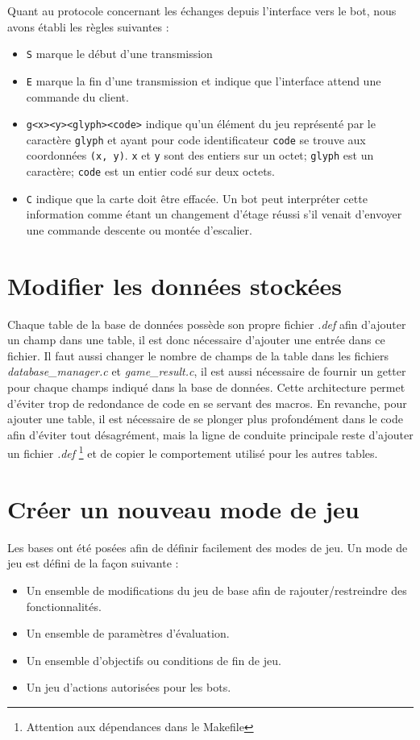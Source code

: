 \documentclass[10pt,a4paper]{report}
\begin{document}
Quant au protocole concernant les échanges depuis l'interface vers le bot, nous avons établi les règles suivantes :
\begin{itemize}
	\item \verb!S! marque le début d'une transmission
	\item \verb!E! marque la fin d'une transmission et indique que l'interface attend une commande du client.
	\item \verb!g<x><y><glyph><code>! indique qu'un élément du jeu représenté
		par le caractère \verb!glyph! et ayant pour code identificateur
		\verb!code! se trouve aux coordonnées \verb!(x, y)!. \verb!x! et
		\verb!y! sont des entiers sur un octet; \verb!glyph! est un caractère;
		\verb!code! est un entier codé sur deux octets.
	\item \verb!C! indique que la carte doit être effacée. Un bot peut interpréter cette information comme étant un changement d'étage réussi s'il venait d'envoyer une commande descente ou montée d'escalier.
\end{itemize}

\section{Modifier les données stockées} \label{sec:modif-bdd}
Chaque table de la base de données possède son propre fichier \emph{.def} afin
d'ajouter un champ dans une table, il est donc nécessaire d'ajouter une entrée
dans ce fichier. Il faut aussi changer le nombre de champs de la table dans les
fichiers \emph{database\_manager.c} et \emph{game\_result.c}, il est aussi
nécessaire de fournir un getter pour chaque champs indiqué dans la base de
données. Cette architecture permet d'éviter trop de redondance de code en se
servant des macros. En revanche, pour ajouter une table, il est nécessaire de se
plonger plus profondément dans le code afin d'éviter tout désagrément, mais la
ligne de conduite principale reste d'ajouter un fichier \emph{.def}
\footnote{Attention aux dépendances dans le Makefile} et de copier le
comportement utilisé pour les autres tables.

\section{Créer un nouveau mode de jeu}
Les bases ont été posées afin de définir facilement des modes de jeu.
Un mode de jeu est défini de la façon suivante :
\begin{itemize}
		\item Un ensemble de modifications du jeu de base afin de
			rajouter/restreindre des fonctionnalités.
		\item Un ensemble de paramètres d'évaluation.
		\item Un ensemble d'objectifs ou conditions de fin de jeu.
		\item Un jeu d'actions autorisées pour les bots.
\end{itemize}
\end{document}
